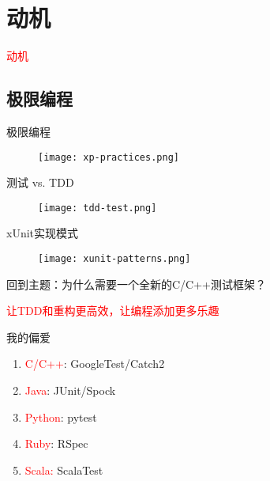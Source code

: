 \section{动机}
\label{sec:motivation}

\begin{frame}
  \begin{center}
    \Huge{\textcolor{red}{动机}}
  \end{center}
\end{frame}

\subsection{极限编程}

\begin{frame}{极限编程}
    \centering
    \begin{figure}
      \centering
      \texttt{[image: xp-practices.png]}
    \end{figure}
\end{frame}

\begin{frame}{测试 vs. TDD}
    \centering
    \begin{figure}
      \centering
      \texttt{[image: tdd-test.png]}
    \end{figure}
\end{frame}

\begin{frame}{xUnit实现模式}
    \centering
    \begin{figure}
      \centering
      \texttt{[image: xunit-patterns.png]}
    \end{figure}
\end{frame}

\begin{frame}{回到主题：为什么需要一个全新的C/C++测试框架？}
  \begin{center}
    \LARGE{\textcolor{red}{让TDD和重构更高效，让编程添加更多乐趣}}
  \end{center}
\end{frame}

\begin{frame}{我的偏爱} 
  \begin{enumerate}
    \item \textcolor{red}{C/C++}: GoogleTest/Catch2
    \item \textcolor{red}{Java}: JUnit/Spock
    \item \textcolor{red}{Python}: pytest
    \item \textcolor{red}{Ruby}: RSpec
    \item \textcolor{red}{Scala:} ScalaTest
  \end{enumerate}
\end{frame}

